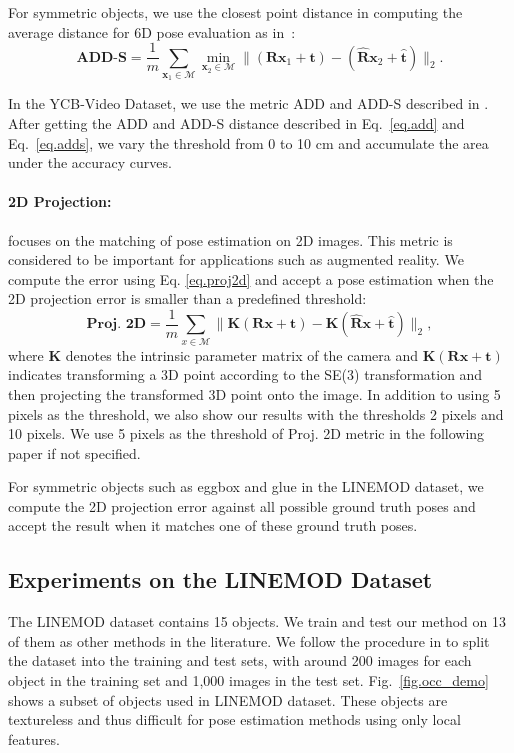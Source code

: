 \documentclass[twocolumn]{svjour3}
\newcommand{\yi}[1]{#1}
\begin{document}
For symmetric objects, we use the closest point distance in computing the average distance for 6D pose evaluation as in~\cite{hinterstoisser2012accv}:
\begin{equation}
\label{eq.adds}
\textbf{ADD-S}=\frac{1}{m}\sum_{\mathbf{x}_1\in \mathcal{M}} \min_{\mathbf{x}_2 \in \mathcal{M}} \|(\mathbf{R}\mathbf{x}_1+\mathbf{t}) - (\mathbf{\hat{R}}\mathbf{x}_2+\mathbf{\hat{t}})\|_2.
\end{equation}

In the YCB-Video Dataset, we use the metric ADD and ADD-S described in \cite{xiang2017posecnn}. After getting the ADD and ADD-S distance described in Eq.~\ref{eq.add} and Eq.~\ref{eq.adds}, we vary the threshold from 0 to 10 cm and accumulate the area under the accuracy curves.

\paragraph{2D Projection:} focuses on the matching of pose estimation on 2D images. This metric is considered to be important for applications such as augmented reality. We compute the error using Eq. \ref{eq.proj2d} and accept a pose estimation when the 2D projection error is smaller than a predefined threshold:
\begin{equation}
\label{eq.proj2d}
\textbf{Proj. 2D}=\frac{1}{m}\sum_{x\in \mathcal{M}}\|\mathbf{K}(\mathbf{R}\mathbf{x}+\mathbf{t}) - \mathbf{K}(\mathbf{\hat{R}}\mathbf{x}+\mathbf{\hat{t}})\|_2,
\end{equation}
where $\mathbf{K}$ denotes the intrinsic parameter matrix of the camera and $\mathbf{K}(\mathbf{R}\mathbf{x}+\mathbf{t})$ indicates transforming a 3D point according to the SE(3) transformation and then projecting the transformed 3D point onto the image. In addition to using 5 pixels as the threshold, we also show our results with the thresholds 2 pixels and 10 pixels. We use 5 pixels as the threshold of Proj. 2D metric in the following paper if not specified.


For symmetric objects such as eggbox and glue in the LINEMOD dataset, we compute the 2D projection error against all possible ground truth poses and accept the result when it matches one of these ground truth poses.

\subsection{Experiments on the LINEMOD Dataset}
\label{sec.exp_on_LM}
The LINEMOD dataset contains 15 objects. We train and test our method on 13 of them as other methods in the literature. We follow the procedure in \citep{brachmann2016uncertainty} to split the dataset into the training and test sets, with around 200 images for each object in the training set and 1,000 images in the test set. \yi{Fig.~\ref{fig.occ_demo} shows a subset of objects used in LINEMOD dataset. These objects are textureless and thus difficult for pose estimation methods using only local features.}
\end{document}
